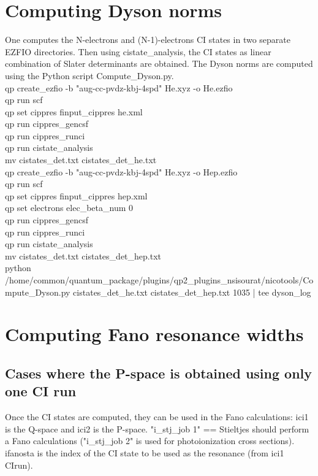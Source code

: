 \documentclass[a4paper, 10 pt]{report}
\begin{document}
\section{Computing Dyson norms}

One computes the N-electrons and (N-1)-electrons CI states in two separate EZFIO directories. Then using cistate\_analysis, the CI states as linear combination of Slater determinants are obtained. The Dyson norms are computed using the Python script Compute\_Dyson.py.\\

\noindent qp create\_ezfio -b "aug-cc-pvdz-kbj-4spd" He.xyz -o He.ezfio\\
qp run scf\\
qp set cippres finput\_cippres he.xml\\
qp run cippres\_gencsf\\
qp run cippres\_runci\\
qp run cistate\_analysis\\
mv cistates\_det.txt cistates\_det\_he.txt\\
qp create\_ezfio -b "aug-cc-pvdz-kbj-4spd" He.xyz -o Hep.ezfio\\
qp run scf\\
qp set cippres finput\_cippres hep.xml\\
qp set electrons elec\_beta\_num 0\\
qp run cippres\_gencsf\\
qp run cippres\_runci\\
qp run cistate\_analysis\\
mv cistates\_det.txt cistates\_det\_hep.txt\\
python /home/common/quantum\_package/plugins/qp2\_plugins\_nsisourat/nicotools/Compute\_Dyson.py cistates\_det\_he.txt cistates\_det\_hep.txt 1035 | tee dyson\_log\\

\section{Computing Fano resonance widths}

\subsection{Cases where the P-space is obtained using only one CI run}

Once the CI states are computed, they can be used in the Fano calculations: ici1 is the Q-space and ici2 is the P-space.  "i\_stj\_job 1" == Stieltjes should perform a Fano calculations ("i\_stj\_job 2" is used for photoionization cross sections). ifanosta is the index of the CI state to be used as the resonance (from ici1 CIrun).\\
\end{document}
